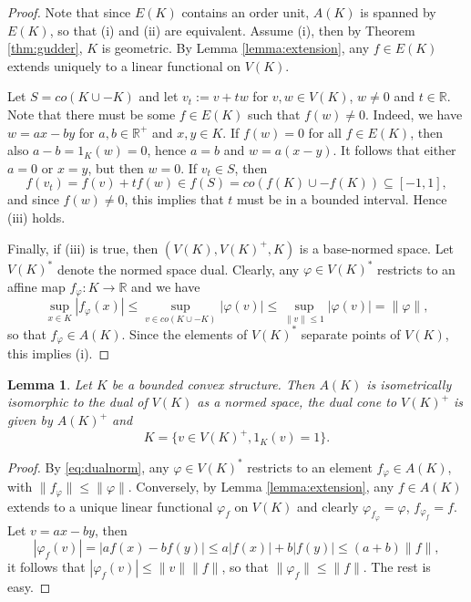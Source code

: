 \documentclass[12pt]{article}
\newtheorem{lemma}{Lemma}
\theoremstyle{remark}
\newcommand{\<}{\langle}
\begin{document}
\begin{proof} Note that since $E(K)$ contains an order unit, $A(K)$ is spanned by $E(K)$, so that (i) and (ii) are equivalent. Assume 
(i), then by Theorem \ref{thm:gudder}, $K$ is geometric. By Lemma \ref{lemma:extension}, any $f\in E(K)$ extends uniquely to a linear functional on $V(K)$. 

Let $S=co(K\cup -K)$ and let $v_t:=v+tw$ for $v,w\in V(K)$, $w\ne 0$ and $t\in \mathbb R$. 
Note that there must be some $f\in E(K)$ such that $f(w)\ne0$. Indeed, we have $w=ax-by$ for $a,b\in \mathbb R^+$ and $x,y\in K$. If $f(w)=0$ for all $f\in E(K)$, 
 then also $a-b=1_K(w)=0$, hence $a=b$ and $w=a(x-y)$. It follows that either $a=0$ or $x=y$, but then $w=0$. If $v_t\in S$, 
  then 
  \[
  f(v_t)=f(v)+tf(w)\in f(S)=co(f(K)\cup -f(K))\subseteq [-1,1],
  \]
   and since $f(w)\ne 0$, this implies that $t$ must be in a bounded interval. Hence (iii) holds. 

Finally, if (iii) is true, then $(V(K), V(K)^+, K)$ is a base-normed space. Let $V(K)^*$ denote the normed space dual. 
Clearly, any $\varphi\in V(K)^*$ restricts to an affine map 
$f_\varphi:K\to \mathbb R$ and  we have
\begin{equation}\label{eq:dualnorm}
\sup_{x\in K} |f_\varphi(x)|\le \sup_{v\in co(K\cup -K)}|\varphi(v)|\le \sup_{\|v\|\le 1}|\varphi(v)|=\|\varphi\|,
\end{equation}
so that $f_\varphi\in A(K)$. Since the elements of $V(K)^*$ separate points of $V(K)$, this implies (i).


\end{proof}


\begin{lemma} Let $K$ be a bounded convex structure. Then  $A(K)$ is isometrically isomorphic to the dual of $V(K)$ as a normed space,  the dual cone to $V(K)^+$ is given by $A(K)^+$ and 
\[
K=\{v\in V(K)^+, 1_K(v)=1\}.
\]
\end{lemma}

\begin{proof} By \eqref{eq:dualnorm}, any $\varphi\in V(K)^*$ restricts to an  element  
 $f_\varphi\in A(K)$, with $\|f_\varphi\|\le \|\varphi\|$.  Conversely, by Lemma \ref{lemma:extension}, any $f\in A(K)$ extends to a unique linear functional $\varphi_f$ on $V(K)$
and clearly $\varphi_{f_\varphi}=\varphi$, $f_{\varphi_f}=f$. Let $v=ax-by$, then
\[
|\varphi_f(v)|=|af(x)-bf(y)|\le a|f(x)|+b|f(y)|\le (a+b)\|f\|,
\]
it follows that $|\varphi_f(v)|\le \|v\|\|f\|$, so that $\|\varphi_f\|\le \|f\|$. The rest is easy.


\end{proof}
\end{document}
